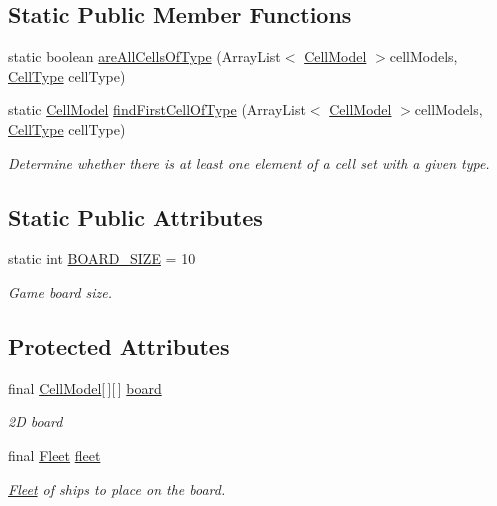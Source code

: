 \subsection*{Static Public Member Functions}
\begin{DoxyCompactItemize}
\item 
static boolean \hyperlink{classbattleship2D_1_1model_1_1BoardModel_a96c8e6db76df3433972e99d4d2ebada0}{are\-All\-Cells\-Of\-Type} (Array\-List$<$ \hyperlink{classbattleship2D_1_1model_1_1CellModel}{Cell\-Model} $>$cell\-Models, \hyperlink{enumbattleship2D_1_1model_1_1CellType}{Cell\-Type} cell\-Type)
\item 
static \hyperlink{classbattleship2D_1_1model_1_1CellModel}{Cell\-Model} \hyperlink{classbattleship2D_1_1model_1_1BoardModel_ab82fdc92af2604db0677e050632e4c52}{find\-First\-Cell\-Of\-Type} (Array\-List$<$ \hyperlink{classbattleship2D_1_1model_1_1CellModel}{Cell\-Model} $>$cell\-Models, \hyperlink{enumbattleship2D_1_1model_1_1CellType}{Cell\-Type} cell\-Type)
\begin{DoxyCompactList}\small\item\em Determine whether there is at least one element of a cell set with a given type. \end{DoxyCompactList}\end{DoxyCompactItemize}
\subsection*{Static Public Attributes}
\begin{DoxyCompactItemize}
\item 
static int \hyperlink{classbattleship2D_1_1model_1_1BoardModel_ae460f6b5b6c201a4260f504cee2bbe88}{B\-O\-A\-R\-D\-\_\-\-S\-I\-Z\-E} = 10
\begin{DoxyCompactList}\small\item\em Game board size. \end{DoxyCompactList}\end{DoxyCompactItemize}
\subsection*{Protected Attributes}
\begin{DoxyCompactItemize}
\item 
final \hyperlink{classbattleship2D_1_1model_1_1CellModel}{Cell\-Model}\mbox{[}$\,$\mbox{]}\mbox{[}$\,$\mbox{]} \hyperlink{classbattleship2D_1_1model_1_1BoardModel_aef391200a2e699e06c2f0efa9c75f93b}{board}
\begin{DoxyCompactList}\small\item\em 2\-D board \end{DoxyCompactList}\item 
final \hyperlink{classbattleship2D_1_1model_1_1Fleet}{Fleet} \hyperlink{classbattleship2D_1_1model_1_1BoardModel_a31a41118d87b809557a0d3579068efe9}{fleet}
\begin{DoxyCompactList}\small\item\em \hyperlink{classbattleship2D_1_1model_1_1Fleet}{Fleet} of ships to place on the board. \end{DoxyCompactList}\end{DoxyCompactItemize}
